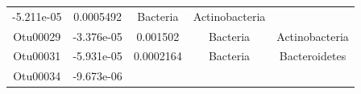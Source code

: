 \documentclass[]{article}
\begin{document}
\begin{longtable}[]{@{}ccccc@{}}
\begin{minipage}[t]{0.16\columnwidth}
-5.211e-05\strut
\end{minipage} & \begin{minipage}[t]{0.14\columnwidth}\centering\strut
0.0005492\strut
\end{minipage} & \begin{minipage}[t]{0.13\columnwidth}\centering\strut
Bacteria\strut
\end{minipage} & \begin{minipage}[t]{0.27\columnwidth}\centering\strut
Actinobacteria\strut
\end{minipage}\tabularnewline
\begin{minipage}[t]{0.13\columnwidth}\centering\strut
Otu00029\strut
\end{minipage} & \begin{minipage}[t]{0.16\columnwidth}\centering\strut
-3.376e-05\strut
\end{minipage} & \begin{minipage}[t]{0.14\columnwidth}\centering\strut
0.001502\strut
\end{minipage} & \begin{minipage}[t]{0.13\columnwidth}\centering\strut
Bacteria\strut
\end{minipage} & \begin{minipage}[t]{0.27\columnwidth}\centering\strut
Actinobacteria\strut
\end{minipage}\tabularnewline
\begin{minipage}[t]{0.13\columnwidth}\centering\strut
Otu00031\strut
\end{minipage} & \begin{minipage}[t]{0.16\columnwidth}\centering\strut
-5.931e-05\strut
\end{minipage} & \begin{minipage}[t]{0.14\columnwidth}\centering\strut
0.0002164\strut
\end{minipage} & \begin{minipage}[t]{0.13\columnwidth}\centering\strut
Bacteria\strut
\end{minipage} & \begin{minipage}[t]{0.27\columnwidth}\centering\strut
Bacteroidetes\strut
\end{minipage}\tabularnewline
\begin{minipage}[t]{0.13\columnwidth}\centering\strut
Otu00034\strut
\end{minipage} & \begin{minipage}[t]{0.16\columnwidth}\centering\strut
-9.673e-06\strut
\end{minipage} & \begin{minipage}[t]{0.14\columnwidth}\centering\strut

\end{minipage}
\end{longtable}
\end{document}
